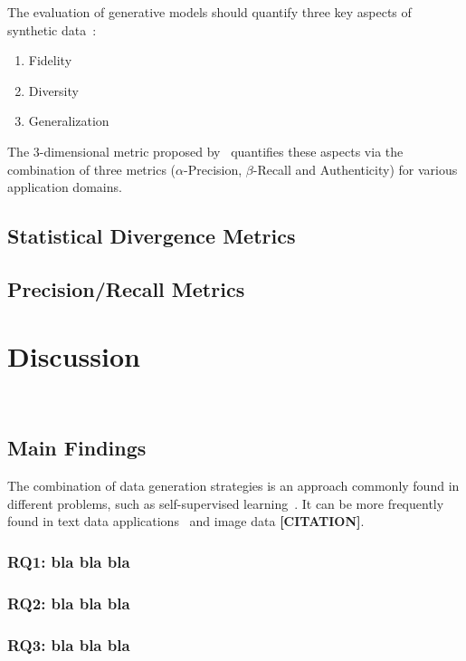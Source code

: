 \documentclass[parskip=full]{scrartcl}
\begin{document}
The evaluation of generative models should quantify three key aspects of
synthetic data~\cite{alaa2022faithful}:

\begin{enumerate}
    \item Fidelity
    \item Diversity 
    \item Generalization
\end{enumerate}

The 3-dimensional metric proposed by~\citet{alaa2022faithful} quantifies these
aspects via the combination of three metrics ($\alpha$-Precision,
$\beta$-Recall and Authenticity) for various application domains.

\subsection{Statistical Divergence Metrics} 

\subsection{Precision/Recall Metrics}

\section{Discussion}~\label{sec:discussion}

\subsection{Main Findings}

The combination of data generation strategies is an approach commonly found in
different problems, such as self-supervised
learning~\cite{grill2020bootstrap}. It can be more frequently found in text
data applications~\cite{bayer2021survey} and image data \textbf{[CITATION]}.

\subsubsection{RQ1: bla bla bla}

\subsubsection{RQ2: bla bla bla}

\subsubsection{RQ3: bla bla bla}
\end{document}

